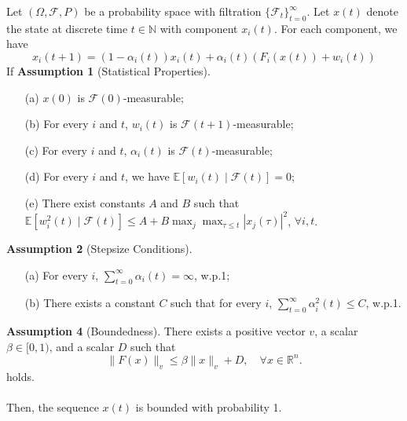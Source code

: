 \begin{theorem}\label{thm:bounded}
Let $(\Omega, \mathcal{F},P)$ be a probability space with filtration $\{\mathcal{F}_t\}_{t=0}^\infty$. Let $x(t)$ denote the state at discrete time $t\in\mathbb{N}$ with component $x_i(t)$. For each component, we have
$$
x_i(t+1) = (1-\alpha_i(t))x_i(t) + \alpha_i(t)(F_i(x(t)) + w_i(t)) 
$$
If \textbf{Assumption 1} (Statistical Properties).
\begin{enumerate}
\item[(a)] $x(0)$ is $\mathcal{F}(0)$-measurable;
\item[(b)] For every $i$ and $t$, $w_i(t)$ is $\mathcal{F}(t+1)$-measurable;
\item[(c)] For every $i$ and $t$, $\alpha_i(t)$ is $\mathcal{F}(t)$-measurable;
\item[(d)] For every $i$ and $t$, we have $\mathbb{E}[w_i(t) \mid \mathcal{F}(t)] = 0$;
\item[(e)] There exist constants $A$ and $B$ such that
$\mathbb{E}[w_i^2(t) \mid \mathcal{F}(t)] \leq A + B \max_j \max_{\tau \leq t} |x_j(\tau)|^2$, $\forall i, t$.
\end{enumerate}

\vspace{1em}

\noindent
\textbf{Assumption 2} (Stepsize Conditions).
\begin{enumerate}
\item[(a)] For every $i$, $\sum_{t=0}^{\infty} \alpha_i(t) = \infty$, w.p.1;
\item[(b)] There exists a constant $C$ such that for every $i$, $\sum_{t=0}^{\infty} \alpha_i^2(t) \leq C$, w.p.1.
\end{enumerate}
\vspace{1em}

\noindent
\textbf{Assumption 4} (Boundedness).
There exists a positive vector $v$, a scalar $\beta \in [0,1)$, and a scalar $D$ such that
\begin{equation}
\|F(x)\|_v \leq \beta\|x\|_v + D, \quad \forall x \in \mathbb{R}^n.
\end{equation}
\noindent holds.\\
\\
\noindent Then, the sequence $x(t)$ is bounded with probability 1.

\end{theorem}
